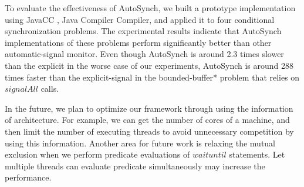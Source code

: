 \documentclass[preprint]{sigplanconf}
\begin{document}
To evaluate the effectiveness of AutoSynch, we built a prototype implementation
using JavaCC \cite{kod04}, Java Compiler Compiler,  and applied it to four
conditional synchronization problems. The experimental results indicate that 
AutoSynch implementations of these problems perform significantly better than
other automatic-signal monitor. Even though AutoSynch is around 2.3 times 
slower than the explicit in the worse case of our experiments, AutoSynch is
around 288 times faster than the explicit-signal in the bounded-buffer* problem 
that relies on $signalAll$ calls. 

In the future, we plan to optimize our framework through using the information 
of architecture. For example, we can get the number of cores of a machine, and
then limit the number of executing threads to avoid unnecessary competition by
using this information. Another area for future work is relaxing the mutual
exclusion when we perform predicate evaluations of $waituntil$ statements. Let
multiple threads can evaluate predicate simultaneously may increase the
performance. 

\end{document}
